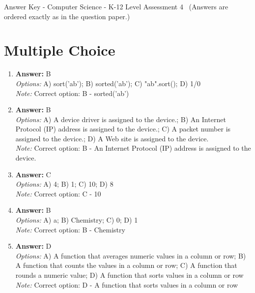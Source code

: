 \documentclass[12pt]{article}
\begin{document}
\begin{center}
Answer Key - Computer Science - K-12 Level Assessment 4 \
\small (Answers are ordered exactly as in the question paper.)
\end{center}

\section*{Multiple Choice}
\begin{enumerate}[label=\arabic*.]
\item \textbf{Answer:} B
\\ \textit{Options:} A) sort('ab'); B) sorted('ab'); C) "ab".sort(); D) 1/0
\\ \textit{Note:} Correct option: B - sorted('ab')
\item \textbf{Answer:} B
\\ \textit{Options:} A) A device driver is assigned to the device.; B) An Internet Protocol (IP) address is assigned to the device.; C) A packet number is assigned to the device.; D) A Web site is assigned to the device.
\\ \textit{Note:} Correct option: B - An Internet Protocol (IP) address is assigned to the device.
\item \textbf{Answer:} C
\\ \textit{Options:} A) 4; B) 1; C) 10; D) 8
\\ \textit{Note:} Correct option: C - 10
\item \textbf{Answer:} B
\\ \textit{Options:} A) a; B) Chemistry; C) 0; D) 1
\\ \textit{Note:} Correct option: B - Chemistry
\item \textbf{Answer:} D
\\ \textit{Options:} A) A function that averages numeric values in a column or row; B) A function that counts the values in a column or row; C) A function that rounds a numeric value; D) A function that sorts values in a column or row
\\ \textit{Note:} Correct option: D - A function that sorts values in a column or row
\end{enumerate}
\end{document}
